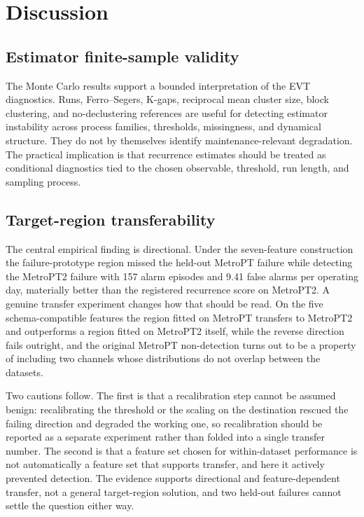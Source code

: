 \section{Discussion}
\label{sec:discussion}

\subsection{Estimator finite-sample validity}

The Monte Carlo results support a bounded interpretation of the EVT diagnostics. Runs, Ferro--Segers, K-gaps, reciprocal mean cluster size, block clustering, and no-declustering references are useful for detecting estimator instability across process families, thresholds, missingness, and dynamical structure. They do not by themselves identify maintenance-relevant degradation. The practical implication is that recurrence estimates should be treated as conditional diagnostics tied to the chosen observable, threshold, run length, and sampling process.

\subsection{Target-region transferability}

The central empirical finding is directional. Under the seven-feature construction the failure-prototype region missed the held-out MetroPT failure while detecting the MetroPT2 failure with 157 alarm episodes and 9.41 false alarms per operating day, materially better than the registered recurrence score on MetroPT2. A genuine transfer experiment changes how that should be read. On the five schema-compatible features the region fitted on MetroPT transfers to MetroPT2 and outperforms a region fitted on MetroPT2 itself, while the reverse direction fails outright, and the original MetroPT non-detection turns out to be a property of including two channels whose distributions do not overlap between the datasets.

Two cautions follow. The first is that a recalibration step cannot be assumed benign: recalibrating the threshold or the scaling on the destination rescued the failing direction and degraded the working one, so recalibration should be reported as a separate experiment rather than folded into a single transfer number. The second is that a feature set chosen for within-dataset performance is not automatically a feature set that supports transfer, and here it actively prevented detection. The evidence supports directional and feature-dependent transfer, not a general target-region solution, and two held-out failures cannot settle the question either way.


